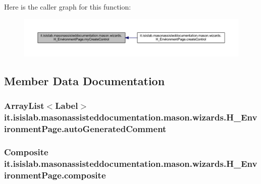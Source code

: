 Here is the caller graph for this function\-:\nopagebreak
\begin{figure}[H]
\begin{center}
\leavevmode
\includegraphics[width=350pt]{classit_1_1isislab_1_1masonassisteddocumentation_1_1mason_1_1wizards_1_1_h___environment_page_a99746d862f89a4dad13af734914642cf_icgraph}
\end{center}
\end{figure}




\subsection{Member Data Documentation}
\hypertarget{classit_1_1isislab_1_1masonassisteddocumentation_1_1mason_1_1wizards_1_1_h___environment_page_a15a1e1e2224d71f7d9a10f962bbeee8f}{
\subsubsection[{auto\-Generated\-Comment}]{\setlength{\rightskip}{0pt plus 5cm}Array\-List$<$Label$>$ it.\-isislab.\-masonassisteddocumentation.\-mason.\-wizards.\-H\-\_\-\-Environment\-Page.\-auto\-Generated\-Comment\hspace{0.3cm}{\ttfamily [private]}}}\label{classit_1_1isislab_1_1masonassisteddocumentation_1_1mason_1_1wizards_1_1_h___environment_page_a15a1e1e2224d71f7d9a10f962bbeee8f}
\hypertarget{classit_1_1isislab_1_1masonassisteddocumentation_1_1mason_1_1wizards_1_1_h___environment_page_a08701d3343b8c6232831af0077e6cb37}{
\subsubsection[{composite}]{\setlength{\rightskip}{0pt plus 5cm}Composite it.\-isislab.\-masonassisteddocumentation.\-mason.\-wizards.\-H\-\_\-\-Environment\-Page.\-composite\hspace{0.3cm}{\ttfamily [private]}}}\label{classit_1_1isislab_1_1masonassisteddocumentation_1_1mason_1_1wizards_1_1_h___environment_page_a08701d3343b8c6232831af0077e6cb37}
